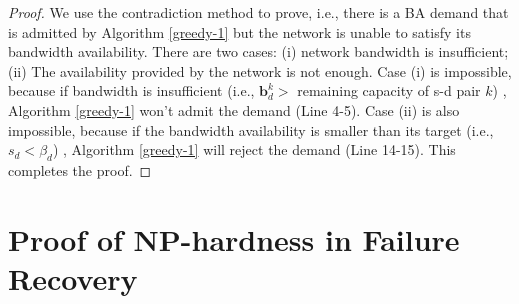 \documentclass[sigconf]{acmart}
\begin{document}
\begin{appendices}
\begin{proof}
We use the contradiction method to prove, i.e., there is a BA demand that is admitted by Algorithm \ref{greedy-1} but the network is unable to satisfy its bandwidth availability.
There are two cases: (i) network bandwidth is insufficient; (ii) The availability provided by the network is not enough. 
Case (i) is impossible, because if bandwidth is insufficient (i.e., $\mathbf{b}^k_d>$ remaining capacity of s-d pair $k$) , Algorithm \ref{greedy-1} won't admit the demand (Line 4-5).
Case (ii) is also impossible, because if the bandwidth availability is smaller than its target (i.e., $s_d <   \beta_{d}$) , Algorithm \ref{greedy-1} will reject the demand (Line 14-15).
This completes the proof. 
\end{proof}


\section{Proof of NP-hardness in Failure Recovery} \label{appendix1}


\end{appendices}
\end{document}
